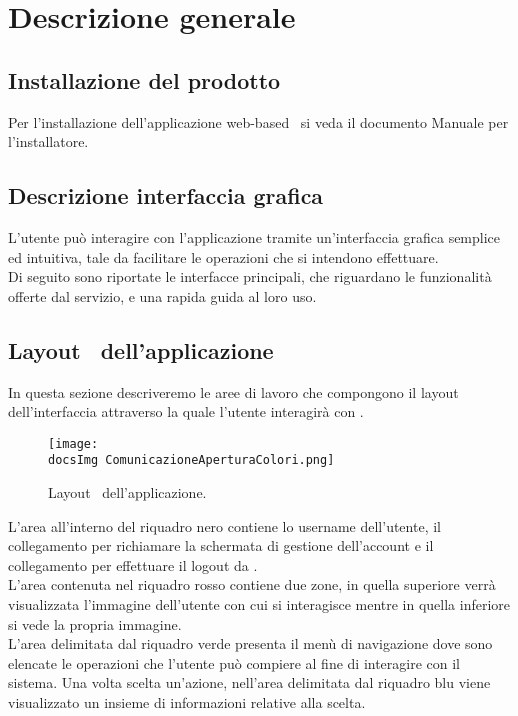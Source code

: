 \section{Descrizione generale}\label{desGen}{

\subsection{Installazione del prodotto}{
Per l'installazione dell'applicazione web-based\g~ si veda il documento Manuale per l'installatore.
}

\subsection{Descrizione interfaccia grafica}{{
L'utente può interagire con l'applicazione \textbf{\mytalk} tramite un'interfaccia grafica semplice ed intuitiva, tale da facilitare le operazioni che si intendono effettuare.\\
Di seguito sono riportate le interfacce principali, che riguardano le funzionalità offerte dal servizio, e una rapida guida al loro uso.
}


\subsection{Layout\g~ dell'applicazione}{
In questa sezione descriveremo le aree di lavoro che compongono il layout\g~ dell'interfaccia attraverso la quale l'utente interagirà con \textbf{\mytalk}.
\begin{figure}[h!]
	\centering
	\texttt{[image: \\docsImg ComunicazioneAperturaColori.png]}
	\caption{Layout\g~ dell'applicazione.}
	\label{fig:layoutGen} 
\end{figure}

L'area all'interno del riquadro nero contiene lo username dell'utente, il collegamento per richiamare la schermata di gestione dell'account e il collegamento per effettuare il logout da \textbf{\mytalk}.\\
L'area contenuta nel riquadro rosso contiene due zone, in quella superiore verrà visualizzata l'immagine dell'utente con cui si interagisce mentre in quella inferiore si vede la propria immagine.\\ 
L'area delimitata dal riquadro verde presenta il menù di navigazione dove sono elencate le operazioni che l'utente può compiere al fine di interagire con il sistema. Una volta scelta un'azione, nell'area delimitata dal riquadro blu viene visualizzato un insieme di informazioni relative alla scelta.

	}
}%

}